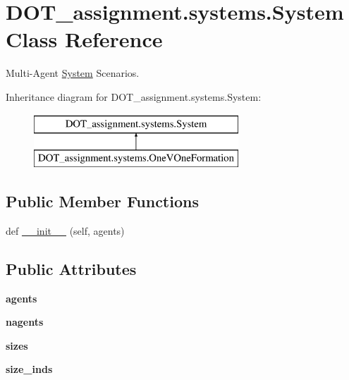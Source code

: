 \hypertarget{class_d_o_t__assignment_1_1systems_1_1_system}{}\section{D\+O\+T\+\_\+assignment.\+systems.\+System Class Reference}
\label{class_d_o_t__assignment_1_1systems_1_1_system}


Multi-\/\+Agent \mbox{\hyperlink{class_d_o_t__assignment_1_1systems_1_1_system}{System}} Scenarios.  


Inheritance diagram for D\+O\+T\+\_\+assignment.\+systems.\+System\+:\begin{figure}[H]
\begin{center}
\leavevmode
\includegraphics[height=2.000000cm]{class_d_o_t__assignment_1_1systems_1_1_system}
\end{center}
\end{figure}
\subsection*{Public Member Functions}
\begin{DoxyCompactItemize}
\item 
def \mbox{\hyperlink{class_d_o_t__assignment_1_1systems_1_1_system_a7a3d17f1f8331c684a408ddbc6c44ed2}{\+\_\+\+\_\+init\+\_\+\+\_\+}} (self, agents)
\end{DoxyCompactItemize}
\subsection*{Public Attributes}
\begin{DoxyCompactItemize}
\item 
\mbox{\label{class_d_o_t__assignment_1_1systems_1_1_system_aeaf4f2592240e25b4ce97b643db6acae}} 
{\bfseries agents}
\item 
\mbox{\label{class_d_o_t__assignment_1_1systems_1_1_system_a75ea2392922616c9626db532d4d4ac21}} 
{\bfseries nagents}
\item 
\mbox{\label{class_d_o_t__assignment_1_1systems_1_1_system_a5318381db43c20a7d325ffce257543fe}} 
{\bfseries sizes}
\item 
\mbox{\label{class_d_o_t__assignment_1_1systems_1_1_system_a7488bee71f0759f7425f87196faaa16d}} 
{\bfseries size\+\_\+inds}
\end{DoxyCompactItemize}


